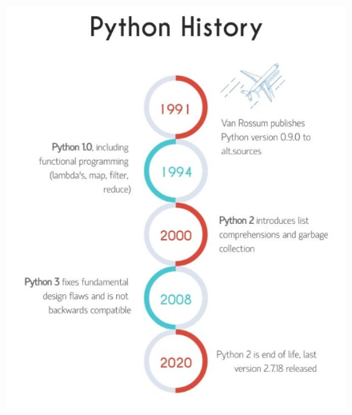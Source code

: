 \begin{flushleft}
	\newpage
	
	\bigskip
	\begin{figure}[h!]
		\centering
		\includegraphics[scale=0.7]{content/chapter0/images/timeline.jpg}
	\end{figure}
	
	
	
\end{flushleft}

\newpage


